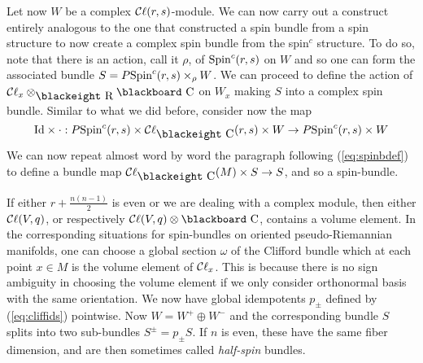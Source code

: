 \documentclass[12pt,titlepage]{article}
\def\bbf#1{\hbox{\blackboard #1}}
\def\bbfeight#1{\hbox{\blackeight #1}}
\def\lC{\bbf C}
\def\lCe{\bbfeight C}
\def\lRe{\bbfeight R}
\def\cC{{\cal C}}
\def\Cl{{\cC\ell}}
\def\Spin{\hbox{Spin}}
\def\Id{\hbox{Id}}
\begin{document}
Let now \(W\) be a complex
\(\Cl(r,s)\)-module.  We can now carry out a construct entirely
analogous to the one that constructed a spin bundle from a spin
structure to now create a complex spin bundle from the spin\({}^c\)
structure. To do so, note that there is an action, call it \(\rho\), of
\(\Spin^c(r,s)\) on \(W\) and so one can form the associated bundle
\(S=P\Spin^c(r,s)\times_\rho W\).  We can proceed to define the action
of \(\Cl_x\otimes_{\lRe}\lC\) on \(W_x\) making \(S\) into a complex
spin bundle. Similar to what we did  before,
 consider now  the map
\[
\Id\times\cdot:P\Spin^c(r,s)\times
\Cl_{\lCe}(r,s) \times W \to P\Spin^c(r,s)\times W
\]%
We can now repeat almost word by word the paragraph following 
(\ref{eq:spinbdef}) to define 
a bundle map
\(\Cl_{\lCe}(M)\times S \to S\), and so a spin-bundle.

If either \(r+\frac{n(n-1)}{2}\) is even or we are
dealing with a complex module, then either \(\Cl(V,q)\), 
or respectively \(\Cl(V,q)\otimes\lC\), contains a
volume element.  In the corresponding
situations for spin-bundles on 
oriented pseudo-Riemannian manifolds,
one can choose a global section \(\omega\) of the
Clifford bundle which at each point \(x\in M\) is the volume element of
\(\Cl_x\). This is because there is no sign ambiguity in choosing
the volume element if we only consider orthonormal basis with the same
orientation. We now have  global idempotents \(p_\pm\) defined by
(\ref{eq:cliffids}) pointwise.
Now \(W=W^+\oplus W^-\)
and the corresponding bundle \(S\) splits into two sub-bundles 
\(S^\pm=p_\pm S\). If \(n\) is even, these have the same fiber dimension,
and are  then sometimes
called {\em half-spin\/}
%
bundles.
\end{document}
